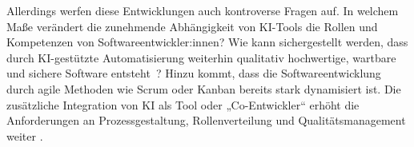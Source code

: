 Allerdings werfen diese Entwicklungen auch kontroverse Fragen auf. In welchem
Maße verändert die zunehmende Abhängigkeit von KI-Tools die Rollen und
Kompetenzen von Softwareentwickler:innen? Wie kann sichergestellt werden, dass
durch KI-gestützte Automatisierung weiterhin qualitativ hochwertige, wartbare
und sichere Software entsteht~\cite{siebert_generative_2024}? Hinzu kommt, dass
die Softwareentwicklung durch agile Methoden wie Scrum oder Kanban bereits
stark dynamisiert ist. Die zusätzliche Integration von KI als Tool oder
„Co-Entwickler“ erhöht die Anforderungen an Prozessgestaltung, Rollenverteilung
und Qualitätsmanagement weiter \cite{geyer_case_2025}.

